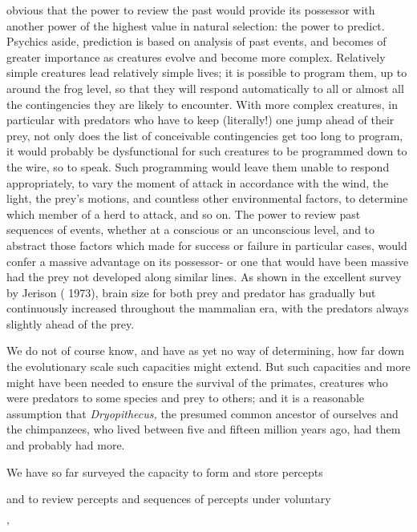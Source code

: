 
obvious that the power to review the past would provide its possessor with another power of the highest value in natural selection: the power to predict. Psychics aside, prediction is based on analysis of past events, and becomes of greater importance as creatures evolve and become more complex. Relatively simple creatures lead relatively simple lives; it is possible to program them, up to around the frog level, so that they will respond automatically to all or almost all the contingencies they are likely to encounter. With more complex crea\-tures, in particular with predators who have to keep (literally!) one jump ahead of their prey, not only does the list of conceivable contin\-gencies get too long to program, it would probably be dysfunctional for such creatures to be programmed down to the wire, so to speak. Such programming would leave them unable to respond appropriately, to vary the moment of attack in accordance with the wind, the light, the prey's motions, and countless other environmental factors, to determine which member of a herd to attack, and so on. The power to review past sequences of events, whether at a conscious or an un\-conscious level, and to abstract those factors which made for success or failure in particular cases, would confer a massive advantage on its possessor- or one that would have been massive had the prey not de\-veloped along similar lines. As shown in the excellent survey by Jerison ( 1973), brain size for both prey and predator has gradually but con\-tinuously increased throughout the mammalian era, with the predators always slightly ahead of the prey.

We do not of course know, and have as yet no way of determin\-ing, how far down the evolutionary scale such capacities might extend. But such capacities and more might have been needed to ensure the survival of the primates, creatures who were predators to some species and prey to others; and it is a reasonable assumption that \textit{Dryopithecus,} the presumed common ancestor of ourselves and the chimpanzees, who lived between five and fifteen million years ago, had them and probably had more.

We have so far surveyed the capacity to form and store percepts

and to review percepts and sequences of percepts under voluntary

'


